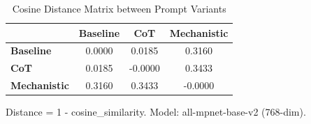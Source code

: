 \begin{table}[htbp]
\centreing
\caption{Cosine Distance Matrix between Prompt Variants}
\label{tab:prompt_distance_matrix}
\begin{tabular}{lccc}
\toprule
 & \textbf{Baseline} & \textbf{CoT} & \textbf{Mechanistic} \\
\midrule
\textbf{Baseline} & 0.0000 & 0.0185 & 0.3160 \\
\textbf{CoT} & 0.0185 & -0.0000 & 0.3433 \\
\textbf{Mechanistic} & 0.3160 & 0.3433 & -0.0000 \\
\bottomrule
\end{tabular}
\begin{tablenotes}
\small
\item Distance = 1 - cosine\_similarity. Model: all-mpnet-base-v2 (768-dim).
\end{tablenotes}
\end{table}